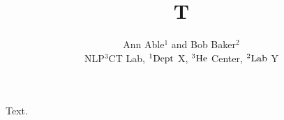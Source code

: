\documentclass{article}
\begin{document}
\title{T}
\author{Ann Able$^{1}$ and Bob Baker$^{2}$\\ NLP$^{3}$CT Lab, ${\rm ^1Dept}$ X, ${\rm ^{3}He}$ Center, ${\rm ^2Lab}$ Y}
\maketitle
Text.
\end{document}
